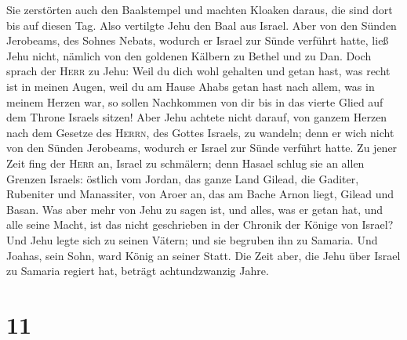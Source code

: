  Sie zerstörten auch den Baalstempel und machten Kloaken
daraus, die sind dort bis auf diesen Tag.  Also vertilgte
Jehu den Baal aus Israel.  Aber von den Sünden Jerobeams,
des Sohnes Nebats, wodurch er Israel zur Sünde verführt hatte, ließ Jehu
nicht, nämlich von den goldenen Kälbern zu Bethel und zu Dan.
 Doch sprach der \textsc{Herr} zu Jehu: Weil du dich wohl
gehalten und getan hast, was recht ist in meinen Augen, weil du am Hause
Ahabs getan hast nach allem, was in meinem Herzen war, so sollen
Nachkommen von dir bis in das vierte Glied auf dem Throne Israels
sitzen!  Aber Jehu achtete nicht darauf, von ganzem
Herzen nach dem Gesetze des \textsc{Herrn}, des Gottes Israels, zu
wandeln; denn er wich nicht von den Sünden Jerobeams, wodurch er Israel
zur Sünde verführt hatte.  Zu jener Zeit fing der
\textsc{Herr} an, Israel zu schmälern; denn Hasael schlug sie an allen
Grenzen Israels: östlich vom Jordan,  das ganze Land
Gilead, die Gaditer, Rubeniter und Manassiter, von Aroer an, das am
Bache Arnon liegt, Gilead und Basan.  Was aber mehr von
Jehu zu sagen ist, und alles, was er getan hat, und alle seine Macht,
ist das nicht geschrieben in der Chronik der Könige von Israel?
 Und Jehu legte sich zu seinen Vätern; und sie begruben
ihn zu Samaria. Und Joahas, sein Sohn, ward König an seiner Statt.
 Die Zeit aber, die Jehu über Israel zu Samaria regiert
hat, beträgt achtundzwanzig Jahre.

\hypertarget{section-10}{%
\section{11}\label{section-10}}

